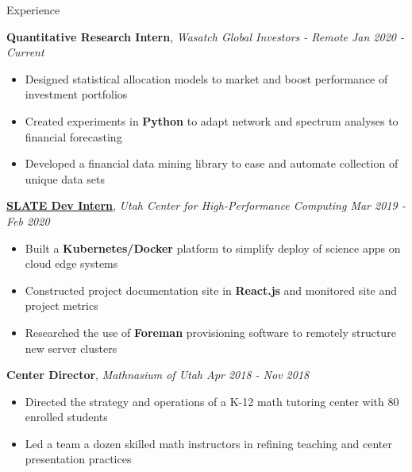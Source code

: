 \documentclass{resume/resume}
\begin{document}
\begin{rSection}{Experience}

    {\bf Quantitative Research Intern}, {\em Wasatch Global Investors - Remote \hfill Jan 2020 - Current}
    \vspace{-6pt}
    \begin{itemize}[nosep]
        \item Designed statistical allocation models to market and boost performance of investment portfolios
        \item Created experiments in {\bf Python} to adapt network and spectrum analyses to financial forecasting
        \item Developed a financial data mining library to ease and automate collection of unique data sets
    \end{itemize}

    {\bf \href{https://slateci.io/}{SLATE Dev Intern}}, {\em Utah Center for High-Performance Computing \hfill Mar 2019 - Feb 2020}
    \vspace{-6pt}
    \begin{itemize}[nosep]
        \item Built a {\bf Kubernetes/Docker} platform to simplify deploy of science apps on cloud edge systems
        \item Constructed project documentation site in {\bf React.js} and monitored site and project metrics
        \item Researched the use of {\bf Foreman} provisioning software to remotely structure new server clusters
    \end{itemize}
    
    {\bf Center Director}, {\em Mathnasium of Utah \hfill Apr 2018 - Nov 2018}
    \vspace{-6pt}
    \begin{itemize}[nosep]
        \item Directed the strategy and operations of a K-12 math tutoring center with 80 enrolled students
        \item Led a team a dozen skilled math instructors in refining teaching and center presentation practices
    \end{itemize}
    

\end{rSection}
\end{document}
